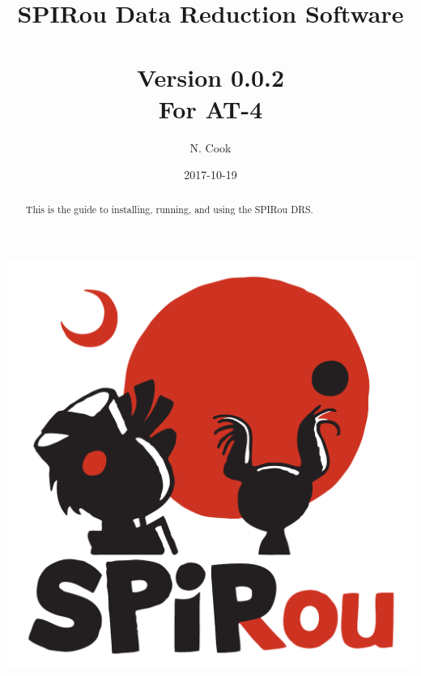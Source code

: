 \documentclass[
a4paper, %
10pt, %
onecolumn, %
openany, %
]{memoir}
\author{N. Cook}
\title{{\Huge SPIRou Data Reduction Software} \vspace{1cm} \\ \HUGE{User Manual} \\ {\small Version 0.0.2} \\ For AT-4}
\date{2017-10-19}
\begin{document}
\frontmatter

\maketitle

\vspace{1cm}
\begin{center}
\includegraphics[width=.5\textwidth]{figures/Logo_SPIRou-22.pdf}
\end{center}
\vspace{1cm}

\begin{abstract}
This is the guide to installing, running, and using the SPIRou DRS.
\end{abstract}
\clearpage

\tableofcontents*
\clearpage




\mainmatter















\appendix





\backmatter


% 
% 
\end{document}
